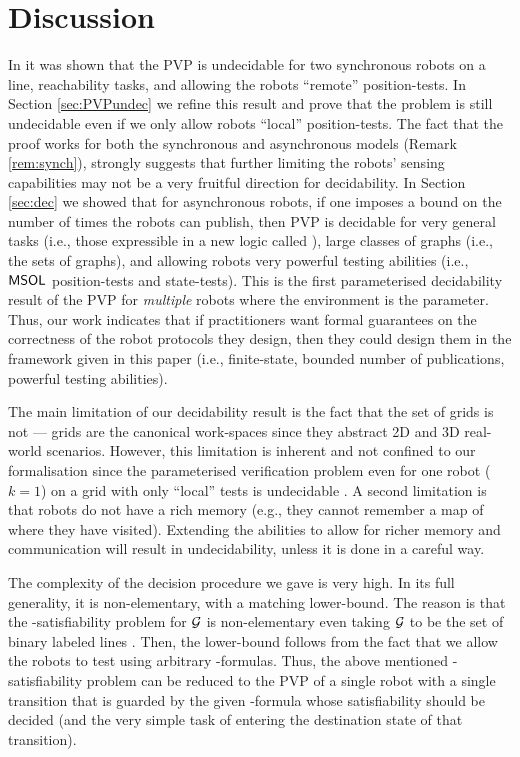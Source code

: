 
\section{Discussion}

In \cite{Rubin15AAMAS} it was shown that the PVP is undecidable for two synchronous robots on a line, reachability tasks, and allowing the robots ``remote'' position-tests. In Section \ref{sec:PVPundec} we refine this result and prove that the problem is still undecidable even if we only allow robots ``local'' position-tests. 
The fact that the proof works for both the synchronous and asynchronous models (Remark \ref{rem:synch}), strongly suggests that {further} limiting the robots' sensing capabilities may not be a very fruitful direction for decidability. In Section \ref{sec:dec} we showed that for asynchronous robots, if one imposes a bound on the number of times the robots can publish, then PVP is decidable for very general tasks (i.e., those expressible in a new logic called \RLTL), large classes of graphs (i.e., the \courcellian sets of graphs), and allowing robots very powerful testing abilities (i.e., $\mathsf{MSOL}$ position-tests {and} state-tests). This is the first parameterised decidability result of the PVP for {\em multiple} robots where the environment is the parameter. Thus, our work indicates that if practitioners want formal guarantees on the correctness of the robot protocols they design, then they could design them in the framework given in this paper (i.e., finite-state, bounded number of publications, powerful testing abilities).

The main limitation of our decidability result is the fact that the set of grids is not \courcellian --- grids are the canonical work-spaces since they abstract 2D and 3D real-world scenarios.  However, this limitation is inherent and not confined to our formalisation since the parameterised verification problem even for one robot ($k=1$) on a grid with only ``local'' tests is undecidable \cite{BlHe67,Rubin15AAMAS}. A second limitation is that robots do not have a rich memory (e.g., they cannot remember a map of where they have visited). Extending the abilities to allow for richer memory and communication will result in undecidability, unless it is done in a careful way. 

The complexity of the decision procedure we gave is very high. In its full generality, it is non-elementary, with a matching lower-bound. The reason is that the \msol-satisfiability problem for $\mathcal{G}$ is non-elementary even taking $\mathcal{G}$ to be the set of binary labeled lines \cite{Stock74}. {Then, }the lower-bound follows from the fact that we allow the robots to test using arbitrary \msol-formulas. Thus, the above mentioned \msol-satisfiability problem can be reduced to the PVP of a single robot with a single transition that is guarded by the given \msol-formula whose satisfiability should be decided (and the very simple task of entering the destination state of that transition). 

